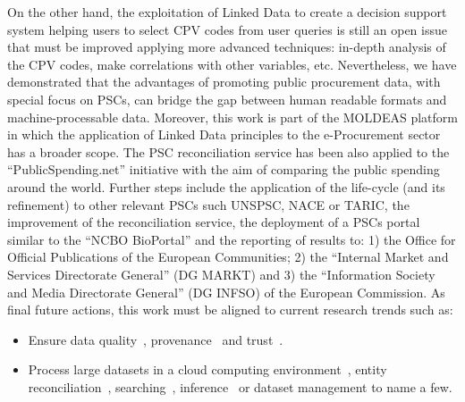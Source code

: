 \documentclass[preprint,12pt]{elsarticle}
\begin{document}
On the other hand, the exploitation of Linked Data to create a decision support system helping users to select CPV codes 
from user queries is still an open issue that must be improved applying more advanced techniques: in-depth analysis of the CPV codes, 
make correlations with other variables, etc. Nevertheless, we have demonstrated that the advantages of promoting public procurement 
data, with special focus on PSCs, can bridge the gap between human readable formats and machine-processable data. Moreover, 
this work is part of the MOLDEAS platform in which the application of Linked Data principles to the e-Procurement sector has a 
broader scope. The PSC reconciliation service has been also applied to the ``PublicSpending.net'' initiative with the aim 
of comparing the public spending around the world. Further steps include the application of the life-cycle (and its refinement) 
to other relevant PSCs such UNSPSC, NACE or TARIC, the improvement of the reconciliation service, the deployment of 
a PSCs portal similar to the ``NCBO BioPortal'' and the reporting of results to: 1) the Office for Official Publications 
of the European Communities; 2) the ``Internal Market and Services Directorate General'' (DG MARKT) and 3) the ``Information
Society and Media Directorate General'' (DG INFSO) of the European Commission. As final future actions, 
this work must be aligned to current research trends such as: 

\begin{itemize}
 \item Ensure data quality~\cite{bizer2007,Bizer2009QA,lodq,link-qa}, 
 provenance~\cite{DBLP:conf/ipaw/HartigZ10} and trust~\cite{Carroll05namedgraphs}.
 \item Process large datasets in a cloud computing environment~\cite{DBLP:conf/closer/HausenblasGHC12},
 entity reconciliation~\cite{Maali_Cyganiak_2011}, searching~\cite{hoga-etal-2011-swse-JWS}, inference~\cite{DBLP:journals/ws/BonattiHPS11} 
 or dataset management to name a few.
\end{itemize}




\end{document}
